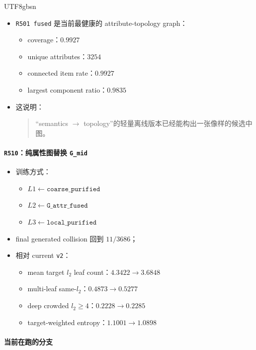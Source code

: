 \documentclass[11pt]{article}
\begin{document}
\begin{CJK*}{UTF8}{gbsn}
\begin{itemize}
  \item \texttt{R501 fused} 是当前最健康的 attribute-topology graph：
  \begin{itemize}
    \item coverage：\(0.9927\)
    \item unique attributes：\(3254\)
    \item connected item rate：\(0.9927\)
    \item largest component ratio：\(0.9835\)
  \end{itemize}
  \item 这说明：
  \begin{quote}
  “semantics \(\rightarrow\) topology”的轻量离线版本已经能构出一张像样的候选中图。
  \end{quote}
\end{itemize}

\paragraph{\texttt{R510}：纯属性图替换 \texttt{G\_mid}}

\begin{itemize}
  \item 训练方式：
  \begin{itemize}
    \item \(L1 \leftarrow \texttt{coarse\_purified}\)
    \item \(L2 \leftarrow \texttt{G\_attr\_fused}\)
    \item \(L3 \leftarrow \texttt{local\_purified}\)
  \end{itemize}
  \item final generated collision 回到 \(11/3686\)；
  \item 相对 current \texttt{v2}：
  \begin{itemize}
    \item mean target \(l_2\) leaf count：\(4.3422 \rightarrow 3.6848\)
    \item multi-leaf same-\(l_2\)：\(0.4873 \rightarrow 0.5277\)
    \item deep crowded \(l_2 \ge 4\)：\(0.2228 \rightarrow 0.2285\)
    \item target-weighted entropy：\(1.1001 \rightarrow 1.0898\)
  \end{itemize}
\end{itemize}

\paragraph{当前在跑的分支}


\end{CJK*}
\end{document}
